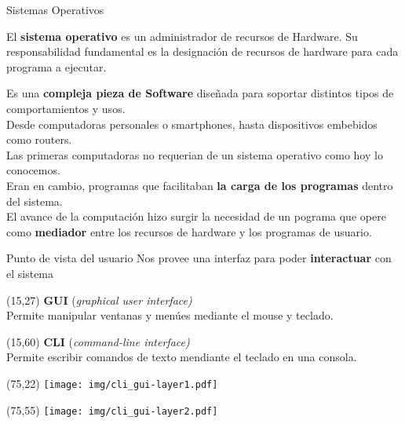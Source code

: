 \documentclass[aspectratio=169]{beamer}
\begin{document}
\begin{frame}{Sistemas Operativos}
    \vspace{0.7cm}
    \begin{tcolorbox}[width=\textwidth,colback={verdeuca!30},title={}]
    El \textbf{sistema operativo} es un administrador de recursos de Hardware.
    Su responsabilidad fundamental es la designación de recursos de hardware para cada programa a ejecutar.
    \end{tcolorbox}
    \small
    \bigskip
    \pause
    Es una \textcolor{verdeuca}{\textbf{compleja pieza de Software}} diseñada para soportar distintos tipos de comportamientos y usos.\\
    Desde computadoras personales o smartphones, hasta dispositivos embebidos como routers.\\
    \bigskip
    \pause
    Las primeras computadoras no requerian de un sistema operativo como hoy lo conocemos.\\
    Eran en cambio, programas que facilitaban \textcolor{verdeuca}{\textbf{la carga de los programas}} dentro del sistema.\\
    \bigskip
    El avance de la computación hizo surgir la necesidad de un pograma que opere como \textcolor{verdeuca}{\textbf{mediador}} entre los recursos de hardware y los programas de usuario.
\end{frame}

\begin{frame}[t]{Punto de vista del usuario}
    Nos provee una interfaz para poder \textcolor{verdeuca}{\textbf{interactuar}} con el sistema
    \begin{textblock}{50}(15,27)
    \normalsize \textbf{GUI} (\emph{graphical user interface)}\\
    \small Permite manipular ventanas y menúes mediante el mouse y teclado.
    \end{textblock}
    \begin{textblock}{50}(15,60)
    \normalsize \textbf{CLI} (\emph{command-line interface)}\\
    \small Permite escribir comandos de texto mendiante el teclado en una consola.
    \end{textblock}
    \begin{textblock}{50}(75,22)
    \texttt{[image: img/cli\_gui-layer1.pdf]}
    \end{textblock}
    \begin{textblock}{50}(75,55)
    \texttt{[image: img/cli\_gui-layer2.pdf]}
    \end{textblock}
\end{frame}
\end{document}
